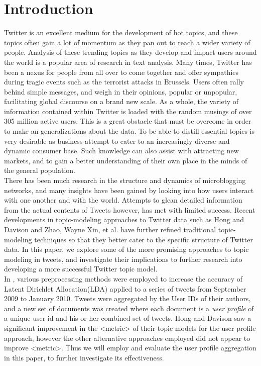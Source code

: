 \documentclass{acm_proc_article-sp}
\begin{document}
\section{Introduction}
\hspace*{5mm}Twitter is an excellent medium for the development of hot topics, and these topics often gain a lot of momentum as they pan out to reach a wider variety of people. Analysis of these trending topics as they develop and impact users around the world is a popular area of research in text analysis. Many times, Twitter has been a nexus for people from all over to come together and offer sympathies during tragic events such as the terrorist attacks in Brussels. Users often rally behind simple messages, and weigh in their opinions, popular or unpopular, facilitating global discourse on a brand new scale. As a whole, the variety of information contained within Twitter is loaded with the random musings of over 305 million active users. This is a great obstacle that must be overcome in order to make an generalizations about the data. To be able to distill essential topics is very desirable as business attempt to cater to an increasingly diverse and dynamic consumer base. Such knowledge can also assist with attracting new markets, and to gain a better understanding of their own place in the minds of the general population. \\
\hspace*{5mm}There has been much research in the structure and dynamics of microblogging networks, and many insights have been gained by looking into how users interact with one another and with the world. Attempts to glean detailed information from the actual contents of Tweets however, has met with limited success. Recent developments in topic-modeling approaches to Twitter data such as Hong and Davison\cite{hong2010empirical} and Zhao, Wayne Xin, et al.\cite{zhao2011comparing} have further refined traditional topic-modeling techniques so that they better cater to the specific structure of Twitter data. In this paper, we explore some of the more promising approaches to topic modeling in tweets, and investigate their implications to further research into developing a more successful Twitter topic model.\\
\hspace*{5mm}In \cite{hong2010empirical}, various preprocessing methods were employed to increase the accuracy of Latent Dirichlet Allocation(LDA) applied to a series of tweets from September 2009 to January 2010. Tweets were aggregated by the User IDs of their authors, and a new set of documents was created where each document is a \textit{user profile} of a unique user id and his or her combined set of tweets. Hong and Davison saw a significant improvement in the <metric> of their topic models for the user profile approach, however the other alternative approaches employed did not appear to improve <metric>. Thus we will employ and evaluate the user profile aggregation in this paper, to further investigate its effectiveness.\\
\end{document}
